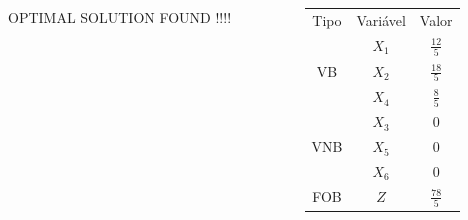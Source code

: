 \begin{frame}
	
	{
		\begin{columns}
			\begin{column}{5cm}
				\begin{mdframed}[backgroundcolor=red!80]
					\centering
					OPTIMAL SOLUTION FOUND !!!!
				\end{mdframed}
			\end{column}
			\begin{column}{5cm}
				\begin{table}
					\begin{tabular}{ c | c | c |}
						\hline
						\cellcolor{blue!100} \color{white}\scriptsize Tipo     & 
						\cellcolor{blue!100} \color{white} \scriptsize Variável &  
						\cellcolor{blue!100} \color{white} \scriptsize Valor \\
						\cellcolor{green!80}  & 
						\cellcolor{green!80} $\scriptstyle X_1$   &  
						\cellcolor{green!80} $\scriptstyle \frac{12}{5}$   \\
						\cellcolor{green!80} VB & 
						\cellcolor{green!80} $\scriptstyle X_2$   &  
						\cellcolor{green!80} $\scriptstyle \frac{18}{5}$   \\
						\cellcolor{green!80} & 
						\cellcolor{green!80} $\scriptstyle X_4$   &  
						\cellcolor{green!100} $\scriptstyle \frac{8}{5}$   \\
						\cellcolor{yellow!50} & 
						\cellcolor{yellow!50} $ \scriptstyle X_3$   &  
						\cellcolor{yellow!50} $\scriptstyle 0$   \\
						\cellcolor{yellow!50} VNB & 
						\cellcolor{yellow!50} $\scriptstyle X_5$   &  
						\cellcolor{yellow!50} $\scriptstyle 0$   \\
						\cellcolor{yellow!50} & 
						\cellcolor{yellow!50} $\scriptstyle X_6$   &  
						\cellcolor{yellow!50} $\scriptstyle 0$   \\						
						\cellcolor{green!80} FOB 				 & 
						\cellcolor{green!80} $\scriptstyle Z$     &  
						\cellcolor{green!80} $\scriptstyle \frac{78}{5}$  \\
						\hline		
					\end{tabular}
				\end{table}
			\end{column}
		\end{columns}
	}	
\end{frame}